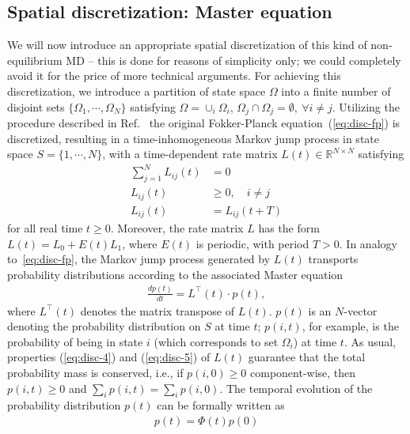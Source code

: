 \documentclass[journal=jctcce,manuscript=article]{achemso}
\newcommand{\vect}[1]{#1}
\newcommand{\myphi}{\Phi}
\begin{document}
\subsection{Spatial discretization: Master equation}
We will now introduce an appropriate spatial discretization of this kind of non-equilibrium MD --  this is done for reasons of simplicity only; we could completely avoid it for the price of more technical arguments.
For achieving this discretization, we 
introduce a partition of state space $\Omega$ into a finite number of disjoint
sets $\{ \Omega_1, \cdots, \Omega_N\}$ satisfying $\Omega = \cup_i \Omega_i$,
$\Omega_j\cap \Omega_j = \emptyset,\ \forall i\neq j$.
Utilizing the procedure described in Ref.~\cite{latorre2011structure} the original Fokker-Planck equation~(\ref{eq:disc-fp})
is discretized, resulting in a time-inhomogeneous Markov jump process in state
space $S = \{1, \cdots, N\}$, with a time-dependent rate
matrix $\vect L(t) \in \mathbb R^{N\times N}$ satisfying
\begin{align}\label{eq:disc-4}
\sum\limits_{j=1}^N L_{ij}(t) & =  0\\ \label{eq:disc-5}
L_{ij}(t) & \ge  0, \quad i\not= j\\
L_{ij}(t) & =  L_{ij}(t+T)
\end{align}
for all real time $t\geq 0$.
Moreover, the rate matrix $L$ has the form $\vect L(t)=\vect L_0+E(t)\vect L_1$,
where $E(t)$ is periodic, with period $T>0$.
In analogy to~\eqref{eq:disc-fp}, the Markov jump process generated by
$\vect L(t)$ transports probability distributions according to the associated Master equation
\begin{align}
  \label{eq:disc-master}
  \frac{d\vect p(t)}{dt} = \vect L^{\top}(t)\cdot \vect p(t),
\end{align}
where $\vect L^{\top}(t)$ denotes the matrix transpose of $\vect L(t)$. $\vect p(t)$ is an $N$-vector denoting the probability distribution on $S$ at time $t$; $p(i,t)$, for example, is the probability of being in state $i$ (which corresponds to set $\Omega_i$) at time $t$.
As usual,  properties (\ref{eq:disc-4}) and (\ref{eq:disc-5}) of
$\vect L(t)$ guarantee that the total probability mass is conserved,
i.e., if $p(i,0)\ge 0$ component-wise, then $p(i,t)\ge 0$ and $\sum_i
p(i,t) = \sum_ip(i,0)$.
The temporal evolution of the probability distribution $\vect p(t)$ can be formally written as
\begin{align}  \label{eq:disc-8}
\vect p(t)=\myphi(t)\vect p(0)
\end{align}
\end{document}
